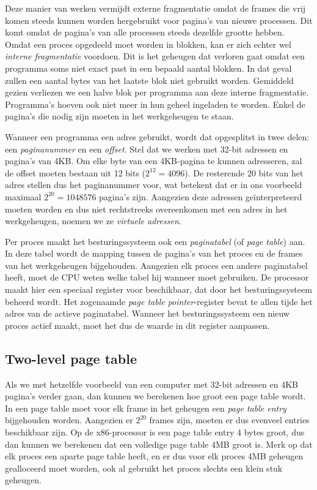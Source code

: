 
Deze manier van werken vermijdt externe fragmentatie omdat de frames die vrij komen steeds kunnen worden hergebruikt voor pagina's van nieuwe processen. Dit komt omdat de pagina's van alle processen steeds dezelfde grootte hebben. Omdat een proces opgedeeld moet worden in blokken, kan er zich echter wel \emph{interne fragmentatie} voordoen. Dit is het geheugen dat verloren gaat omdat een programma soms niet exact past in een bepaald aantal blokken. In dat geval zullen een aantal bytes van het laatste blok niet gebruikt worden. Gemiddeld gezien verliezen we een halve blok per programma aan deze interne fragmentatie. Programma's hoeven ook niet meer in hun geheel ingeladen te worden. Enkel de pagina's die nodig zijn moeten in het werkgeheugen te staan.

Wanneer een programma een adres gebruikt, wordt dat opgesplitst in twee delen: een \emph{paginanummer} en een \emph{offset}. Stel dat we werken met 32-bit adressen en pagina's van 4KB. Om elke byte van een 4KB-pagina te kunnen adresseren, zal de offset moeten bestaan uit 12 bits ($2^{12} = 4096$). De resterende 20 bits van het adres stellen dus het paginanummer voor, wat betekent dat er in ons voorbeeld maximaal $2^{20} = 1048576$ pagina's zijn. Aangezien deze adressen ge\"interpreteerd moeten worden en dus niet rechtstreeks overeenkomen met een adres in het werkgeheugen, noemen we ze \emph{virtuele adressen}.

Per proces maakt het besturingssysteem ook een \emph{paginatabel} (of \emph{page table}) aan. In deze tabel wordt de mapping tussen de pagina's van het proces en de frames van het werkgeheugen bijgehouden. Aangezien elk proces een andere paginatabel heeft, moet de CPU weten welke tabel hij wanneer moet gebruiken. De processor maakt hier een speciaal register voor beschikbaar, dat door het besturingssysteem beheerd wordt. Het zogenaamde \emph{page table pointer}-register bevat te allen tijde het adres van de actieve paginatabel. Wanneer het besturingssysteem een nieuw proces actief maakt, moet het dus de waarde in dit register aanpassen.


\subsection{Two-level page table}

Als we met hetzelfde voorbeeld van een computer met 32-bit adressen en 4KB pagina's verder gaan, dan kunnen we berekenen hoe groot een page table wordt. In een page table moet voor elk frame in het geheugen een \emph{page table entry} bijgehouden worden. Aangezien er $2^{20}$ frames zijn, moeten er dus evenveel entries beschikbaar zijn. Op de x86-processor is een page table entry 4 bytes groot, dus dan kunnen we berekenen dat een volledige page table 4MB groot is. Merk op dat elk proces een aparte page table heeft, en er dus voor elk proces 4MB geheugen gealloceerd moet worden, ook al gebruikt het proces slechts een klein stuk geheugen.


